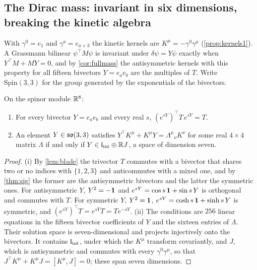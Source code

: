 \subsection{The Dirac mass: invariant in six dimensions, breaking the kinetic algebra}
\label{sec:massdirac}

With $\gamma^0=e_1$ and $\gamma^a=e_{a+3}$ the kinetic kernels are $K^\mu=-\gamma^0\gamma^\mu$ (\cref{prop:kernels1}). A Grassmann bilinear
$\psi^{\!\top}M\psi$ is invariant under $\delta\psi=Y\psi$ exactly when $Y^{\!\top}M+MY=0$, and by \cref{cor:fullmass} the antisymmetric
kernels with this property for all fifteen bivectors $Y=e_ae_b$ are the multiples of $T$. Write $\mathrm{Spin}(3,3)$ for the group
generated by the exponentials of the bivectors.

\begin{proposition}
\label{mb:Tinv}
On the spinor module $\mathbb{R}^8$:
\begin{enumerate}[label=(\roman*),leftmargin=2.2em]
\item For every bivector $Y=e_ae_b$ and every real $s$, $(e^{sY})^{\!\top}T\,e^{sY}=T$.
\item An element $Y\in\mathfrak{so}(3,3)$ satisfies $Y^{\!\top}K^\mu+K^\mu Y=\Lambda^\mu{}_\nu K^\nu$ for some real $4\times4$ matrix $\Lambda$ if and only if
$Y\in\mathfrak l_{\rm int}\oplus\mathbb{R} J$, a space of dimension seven.
\end{enumerate}
\end{proposition}

\begin{proof}
(i) By \cref{lem:blade} the trivector $T$ commutes with a bivector that shares two or no indices with $\{1,2,3\}$ and anticommutes with a
mixed one, and by \cref{thm:sig} the former are the antisymmetric bivectors and the latter the symmetric ones. For antisymmetric $Y$,
$Y^2=-\mathbf 1$ and $e^{sY}=\cos s\,\mathbf 1+\sin s\,Y$ is orthogonal and commutes with $T$. For symmetric $Y$, $Y^2=\mathbf 1$, $e^{sY}=\cosh s\,\mathbf 1+\sinh s\,Y$ is
symmetric, and $(e^{sY})^{\!\top}T=e^{sY}T=Te^{-sY}$. (ii) The conditions are $256$ linear equations in the fifteen bivector coefficients
of $Y$ and the sixteen entries of $\Lambda$. Their solution space is seven-dimensional and projects injectively onto the bivectors. It
contains $\mathfrak l_{\rm int}$, under which the $K^\mu$ transform covariantly, and $J$, which is antisymmetric and commutes with every $\gamma^0\gamma^\mu$,
so that $J^{\!\top}K^\mu+K^\mu J=[K^\mu,J]=0$; these span seven dimensions.
\end{proof}

